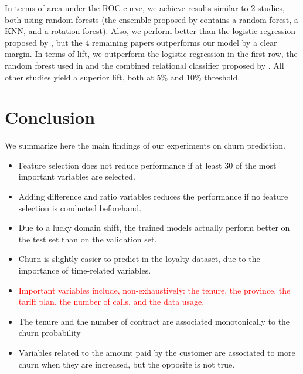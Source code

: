In terms of area under the ROC curve, we achieve results similar to 2 studies,
both using random forests (the ensemble proposed by \textcite{idris2014ensemble}
contains a random forest, a KNN, and a rotation forest). Also, we perform better
than the logistic regression proposed by \textcite{coussement2017comparative},
but the 4 remaining papers outperforms our model by a clear margin. In terms of
lift, we outperform the logistic regression in the first row, the random forest
used in \textcite{mitrovic2018operational} and the combined relational
classifier proposed by \textcite{verbeke2014social}. All other studies yield a
superior lift, both at 5\% and 10\% threshold.

\section{Conclusion}

We summarize here the main findings of our experiments on churn prediction.

\begin{itemize}
    \item Feature selection does not reduce performance if at least 30 of the
    most important variables are selected.
    \item Adding difference and ratio variables reduces the performance if no
    feature selection is conducted beforehand.
    \item Due to a lucky domain shift, the trained models actually perform
    better on the test set than on the validation set.
    \item Churn is slightly easier to predict in the loyalty dataset, due to
    the importance of time-related variables.
    \item \textcolor{red}{Important variables include, non-exhaustively: the tenure, the
    province, the tariff plan, the number of calls, and the data usage.}
    \item The tenure and the number of contract are associated monotonically to
    the churn probability
    \item Variables related to the amount paid by the customer are associated to
    more churn when they are increased, but the opposite is not true.
\end{itemize}
